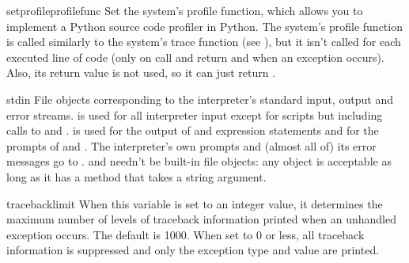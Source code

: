 
\begin{funcdesc}{setprofile}{profilefunc}
  Set the system's profile function, which allows you to implement a
  Python source code profiler in Python.  The system's profile function
  is called similarly to the system's trace function (see
  ), but it isn't called for each executed line of
  code (only on call and return and when an exception occurs).  Also,
  its return value is not used, so it can just return .
\end{funcdesc}

\begin{datadesc}{stdin}
  File objects corresponding to the interpreter's standard input,
  output and error streams.   is used for all
  interpreter input except for scripts but including calls to
   and .   is used
  for the output of  and expression statements and for the
  prompts of  and .  The interpreter's
  own prompts and (almost all of) its error messages go to
  .   and  needn't
  be built-in file objects: any object is acceptable as long as it has
  a  method that takes a string argument.
\end{datadesc}

\begin{datadesc}{tracebacklimit}
When this variable is set to an integer value, it determines the
maximum number of levels of traceback information printed when an
unhandled exception occurs.  The default is 1000.  When set to 0 or
less, all traceback information is suppressed and only the exception
type and value are printed.
\end{datadesc}
